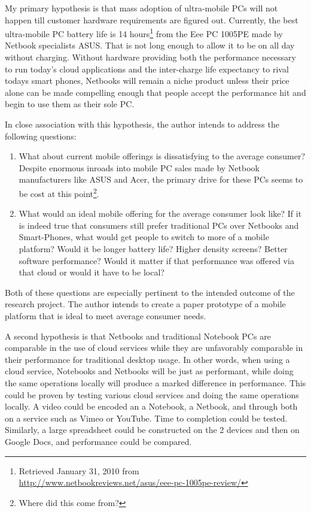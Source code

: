 My primary hypothesis is that mass adoption of ultra-mobile PCs will not happen
till customer hardware requirements are figured out.  Currently, the best
ultra-mobile PC battery life is 14 hours\footnote{Retrieved January 31, 2010
from\\ \url{http://www.netbookreviews.net/asus/eee-pc-1005pe-review/}}            %
from the Eee PC 1005PE made by Netbook specialists ASUS.  That is not long        %
enough to allow it to be on all day without charging.  Without hardware           %
providing both the performance necessary to run today's cloud applications and    %
the inter-charge life expectancy to rival todays smart phones, Netbooks will
remain a niche product unless their price alone can be made compelling enough
that people accept the performance hit and begin to use them as their sole PC.

In close association with this hypothesis, the author intends to address the
following questions:

\begin{enumerate}

\item What about current mobile offerings is dissatisfying to the average
  consumer?  Despite enormous inroads into mobile PC sales made by Netbook
  manufacturers like ASUS and Acer, the primary drive for these PCs seems to be
  cost at this point\footnote{Where did this come from?}. %

\item What would an ideal mobile offering for the average consumer look like?
  If it is indeed true that consumers still prefer traditional PCs over Netbooks
  and Smart-Phones, what would get people to switch to more of a mobile
  platform?  Would it be longer battery life?  Higher density screens?  Better
  software performance?  Would it matter if that performance was offered via
  that cloud or would it have to be local?

\end{enumerate}

Both of these questions are especially pertinent to the intended outcome of the
research project.  The author intends to create a paper prototype of a mobile
platform that is ideal to meet average consumer needs.

A second hypothesis is that Netbooks and traditional Notebook PCs are comparable
in the use of cloud services while they are unfavorably comparable in their
performance for traditional desktop usage.  In other words, when using a cloud
service, Notebooks and Netbooks will be just as performant, while doing the same
operations locally will produce a marked difference in performance.  This could
be proven by testing various cloud services and doing the same operations
locally.  A video could be encoded an a Notebook, a Netbook, and through both on
a service such as Vimeo or YouTube.  Time to completion could be
tested. Similarly, a large spreadsheet could be constructed on the 2 devices and
then on Google Docs, and performance could be compared.

